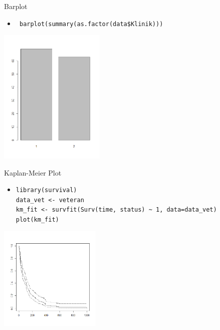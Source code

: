 \documentclass[xcolor=dvipsnames, aspectratio = 169]{beamer}
\begin{document}
\begin{frame}[fragile]{Barplot}
	\begin{itemize}
		\item \verb+ barplot(summary(as.factor(data$Klinik)))+
	\end{itemize}
			
	\begin{center}
		\includegraphics[height=6.5cm]{Barplot}
	\end{center}
\end{frame}

\begin{frame}[fragile]{Kaplan-Meier Plot}
	\begin{itemize}
		\item \verb+library(survival)+ \\ \verb+data_vet <- veteran+ \\ \verb+km_fit <- survfit(Surv(time, status) ~ 1, data=data_vet)+ \\ \verb+plot(km_fit)+
	\end{itemize}
			
	\begin{center}
		\includegraphics[height=5cm]{KM1}
	\end{center}
\end{frame}
\end{document}
